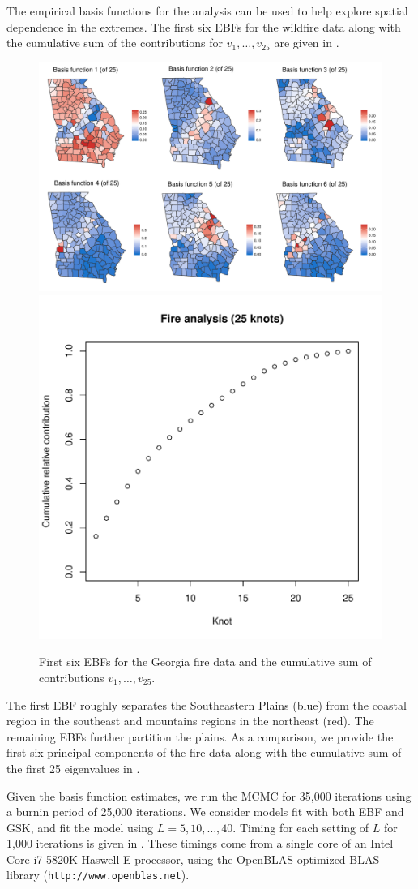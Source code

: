 \documentclass[11pt]{article}
\begin{document}
The empirical basis functions for the analysis can be used to help explore spatial dependence in the extremes.
The first six EBFs for the wildfire data along with the cumulative sum of the contributions for $v_1, \ldots, v_{25}$ are given in .
\begin{figure}[htbp] %
  \centering
  \includegraphics[width=\linewidth]{plots/fire-ebf-panel.pdf}\\
  \includegraphics[width=0.45\linewidth]{plots/firev-25.pdf}
  \caption{First six EBFs for the Georgia fire data and the cumulative sum of contributions $v_1, \ldots, v_{25}$.}
  \label{ebfig:fire-ebfpanel}
\end{figure}
The first EBF roughly separates the Southeastern Plains (blue) from the coastal region in the southeast and mountains regions in the northeast (red).
The remaining EBFs further partition the plains.
As a comparison, we provide the first six principal components of the fire data along with the cumulative sum of the first 25 eigenvalues in .

Given the basis function estimates, we run the MCMC for 35,000 iterations using a burnin period of 25,000 iterations.
We consider models fit with both EBF and GSK, and fit the model using $L = 5, 10, \ldots, 40$.
Timing for each setting of $L$ for 1,000 iterations is given in .
These timings come from a single core of an Intel Core i7-5820K Haswell-E processor, using the OpenBLAS optimized BLAS library (\texttt{http://www.openblas.net}).
\end{document}
